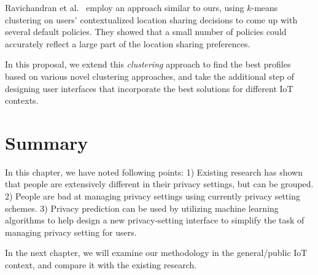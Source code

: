 Ravichandran et al.~\cite{ravichandran2009capturing} employ an approach similar to ours, using $k$-means clustering on users' contextualized location sharing decisions to come up with several default policies. They showed that a small number of policies could accurately reflect a large part of the location sharing preferences. 

In this proposal, we extend this \emph{clustering} approach to find the best profiles based on various novel clustering approaches, and take the additional step of designing user interfaces that incorporate the best solutions for different IoT contexts.

\section{Summary}
In this chapter, we have noted following points: 1) Existing research has shown that people are extensively different in their privacy settings, but can be grouped. 2) People are bad at managing privacy settings using currently privacy setting schemes. 3) Privacy prediction can be used by utilizing machine learning algorithms to help design a new privacy-setting interface to simplify the task of managing privacy setting for users. 

In the next chapter, we will examine our methodology in the general/public IoT context, and compare it with the existing research.